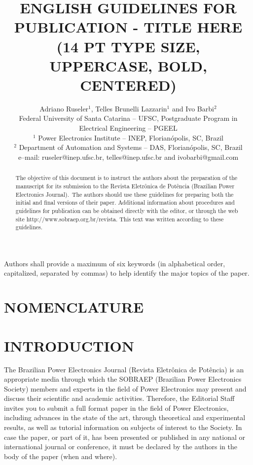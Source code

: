\documentclass[english]{sobraep}
\title{ENGLISH GUIDELINES FOR PUBLICATION - TITLE HERE \\(14 PT TYPE SIZE, UPPERCASE, BOLD, CENTERED)}
\author{Adriano Ruseler$^{1}$, Telles Brunelli Lazzarin$^{1}$ and Ivo Barbi$^{2}$\\
	\normalsize Federal University of Santa Catarina -- UFSC, Postgraduate Program in Electrical Engineering -- PGEEL \\
	\normalsize $^{1}$ Power Electronics Institute -- INEP, Florianópolis, SC, Brazil\\
	\normalsize $^{2}$ Department of Automation and Systems -- DAS, Florianópolis, SC, Brazil\\
	\normalsize e--mail: ruseler@inep.ufsc.br, telles@inep.ufsc.br and ivobarbi@gmail.com
}
\begin{document}
\maketitle

\begin{abstract}
	The objective of this document is to instruct the authors about the preparation of the manuscript for its submission to the Revista Eletrônica de Potência (Brazilian Power Electronics Journal).~The authors should use these guidelines for preparing both the initial and final versions of their paper. Additional information about procedures and guidelines for publication can be obtained directly with the editor, or through the web site http://www.sobraep.org.br/revista. This text was written according to these guidelines.
\end{abstract}

\begin{keywords}
	Authors shall provide a maximum of six keywords (in alphabetical order, capitalized, separated by commas) to help identify the major topics of the paper.
\end{keywords}


\let\thefootnote\relax{}



\section*{NOMENCLATURE}




\section{INTRODUCTION}

The Brazilian Power Electronics Journal (Revista Eletrônica de Potência) is an appropriate media through which the SOBRAEP (Brazilian Power Electronics Society) members and experts in the field of Power Electronics may present and discuss their scientific and academic activities. Therefore, the Editorial Staff invites you to submit a full format paper in the field of Power Electronics, including advances in the state of the art, through theoretical and experimental results, as well as tutorial information on subjects of interest to the Society. In case the paper, or part of it, has been presented or published in any national or international journal or conference, it must be declared by the authors in the body of the paper (when and where). 
\end{document}
